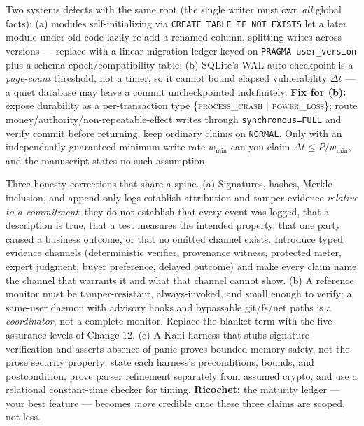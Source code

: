 \documentclass[11pt,a4paper]{article}
\begin{document}
\begin{change}
Two systems defects with the same root (the single writer must own \emph{all} global facts): (a) modules self-initializing via \texttt{CREATE TABLE IF NOT EXISTS} let a later module under old code lazily re-add a renamed column, splitting writes across versions --- replace with a linear migration ledger keyed on \texttt{PRAGMA user\_version} plus a schema-epoch/compatibility table; (b) SQLite's WAL auto-checkpoint is a \emph{page-count} threshold, not a timer, so it cannot bound elapsed vulnerability $\Delta t$ --- a quiet database may leave a commit uncheckpointed indefinitely. \textbf{Fix for (b):} expose durability as a per-transaction type \{\textsc{process\_crash} $\mid$ \textsc{power\_loss}\}; route money/authority/non-repeatable-effect writes through \texttt{synchronous=FULL} and verify commit before returning; keep ordinary claims on \texttt{NORMAL}. Only with an independently guaranteed minimum write rate $w_\text{min}$ can you claim $\Delta t \le P/w_\text{min}$, and the manuscript states no such assumption.
\end{change}

\begin{change}
Three honesty corrections that share a spine. (a) Signatures, hashes, Merkle inclusion, and append-only logs establish attribution and tamper-evidence \emph{relative to a commitment}; they do not establish that every event was logged, that a description is true, that a test measures the intended property, that one party caused a business outcome, or that no omitted channel exists. Introduce typed evidence channels (deterministic verifier, provenance witness, protected meter, expert judgment, buyer preference, delayed outcome) and make every claim name the channel that warrants it and what that channel cannot show. (b) A reference monitor must be tamper-resistant, always-invoked, and small enough to verify; a same-user daemon with advisory hooks and bypassable git/fs/net paths is a \emph{coordinator}, not a complete monitor. Replace the blanket term with the five assurance levels of Change 12. (c) A Kani harness that stubs signature verification and asserts absence of panic proves bounded memory-safety, not the prose security property; state each harness's preconditions, bounds, and postcondition, prove parser refinement separately from assumed crypto, and use a relational constant-time checker for timing. \textbf{Ricochet:} the maturity ledger --- your best feature --- becomes \emph{more} credible once these three claims are scoped, not less.
\end{change}
\end{document}
